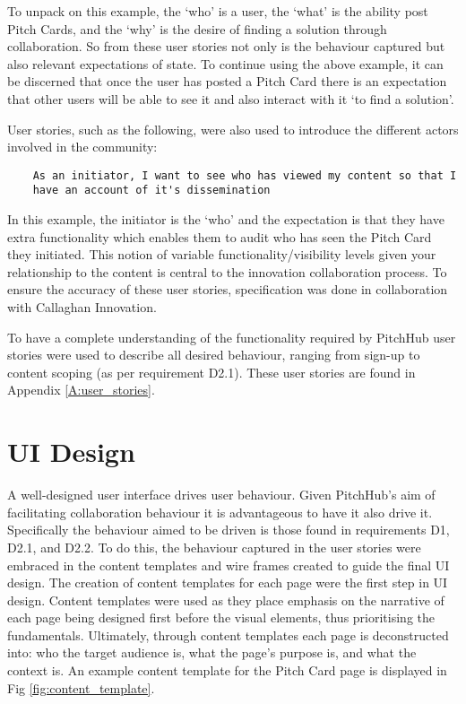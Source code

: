 To unpack on this example, the `who' is a user, the `what' is the ability post Pitch Cards, and the `why' is the desire of finding a solution through collaboration.
So from these user stories not only is the behaviour captured but also relevant expectations of state. To continue using the above example, it can be discerned that once the user has posted a Pitch Card there is an expectation that other users will be able to see it and also interact with it `to find a solution'. 

User stories, such as the following, were also used to introduce the different actors involved in the community:

\begin{verbatim}
    As an initiator, I want to see who has viewed my content so that I 
    have an account of it's dissemination
\end{verbatim}

In this example, the initiator is the `who' and the expectation is that they have extra functionality which enables them to audit who has seen the Pitch Card they initiated. This notion of variable functionality/visibility levels given your relationship to the content is central to the innovation collaboration process. To ensure the accuracy of these user stories, specification was done in collaboration with Callaghan Innovation. 

To have a complete understanding of the functionality required by PitchHub user stories were used to describe all desired behaviour, ranging from sign-up to content scoping (as per requirement D2.1). These user stories are found in Appendix \ref{A:user_stories}.


\section{UI Design}
A well-designed user interface drives user behaviour. Given PitchHub's aim of facilitating collaboration behaviour it is advantageous to have it also drive it. Specifically the behaviour aimed to be driven is those found in requirements D1, D2.1, and D2.2. To do this, the behaviour captured in the user stories were embraced in the content templates and wire frames created to guide the final UI design.
The creation of content templates for each page were the first step in UI design. Content templates were used as they place emphasis on the narrative of each page being designed first before the visual elements, thus prioritising the fundamentals. Ultimately, through content templates each page is deconstructed into: who the target audience is, what the page's purpose is, and what the context is. An example content template for the Pitch Card page is displayed in Fig \ref{fig:content_template}.

